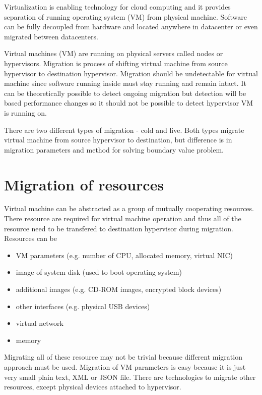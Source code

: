 


Virtualization is enabling technology for cloud computing and it provides separation of running operating system (\Ac{VM}) from physical machine. Software can be fully decoupled from hardware and located anywhere in datacenter or even migrated between datacenters. 

Virtual machines (\Ac{VM}) are running on physical servers called nodes or hypervisors. Migration is process of shifting virtual machine from source hypervisor to destination hypervisor. Migration should be undetectable for virtual machine since software running inside must stay running and remain intact. It can be theoretically possible to detect ongoing migration but detection will be based performance changes so it should not be possible to detect hypervisor \Ac{VM} is running on.


There are two different types of migration - cold and live. Both types migrate virtual machine from source hypervisor to destination, but difference is in migration parameters and method for solving boundary value problem.

\section{Migration of resources}
Virtual machine can be abstracted as a group of mutually cooperating resources. There resource are required for virtual machine operation and thus all of the resource need to be transfered to destination hypervisor during migration. Resources can be
\begin{itemize}
	\item \Ac{VM} parameters (e.g. number of \Ac{CPU}, allocated memory, virtual \Ac{NIC})
	\item image of system disk (used to boot operating system)
	\item additional images (e.g. CD-ROM images, encrypted block devices)
	\item other interfaces (e.g. physical \Ac{USB} devices)
	\item virtual network
	\item memory
\end{itemize}
Migrating all of these resource may not be trivial because different migration approach must be used. Migration of \Ac{VM} parameters is easy because it is just very small plain text, \Ac{XML} or \Ac{JSON} file. There are technologies to migrate other resources, except physical devices attached to hypervisor.

